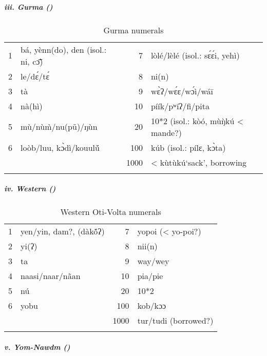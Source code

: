\clearpage
\subparagraph{iii. Gurma ()}

\begin{table}
\caption{\label{tab:3:168}Gurma numerals}


\begin{tabularx}{\textwidth}{lXrX}
\lsptoprule

{1} & bá, yènn(do), den (isol.: ni, c{\={\~{ɔ}}}) & {7} & lòlé/lèlé (isol.: s{\'{ɛ}}{\'{ɛ}}i, yehì)\\
{2} & le/d{\'{ɛ}}/t{\'{ɛ}} & {8} & ni(n)\\
{3} & tà & {9} & w{\`{ɛ}}ʔ/w{\'{ɛ}}ɛ/w{\'{ɔ}}ì/wá{\={i}}\\
{4} & nà(hì) & {10} & píík/pʷíʔ/fi/pita\\
{5} & m{\`{u}}/n{\`{u}}{\`{m}}/nu(p{\~{u}})/ŋ{\`{u}}n & {20} & 10*2 (isol.: kòó, m{\`{u}}{\`{ŋ}}k{\'{u}} < mande?)\\
{6} & loòb/luu, k{\`{ɔ}}dì/kouul{\'{\~u}} & {100} & k{\'{u}}b (isol.: pílɛ, k{\`{ɔ}}ta)\\
&  & {1000} & < k{\`{u}}t{\`{u}}k{\'{u}}‘sack', borrowing\\
\lspbottomrule
\end{tabularx}
\end{table}

\subparagraph{iv. Western ()}

\begin{table}
\caption{\label{tab:3:169}Western Oti-Volta numerals}


\begin{tabularx}{\textwidth}{lXrX}
\lsptoprule

{1} & yen/yin, dam?, (dàk{\'{\~o}}ʔ) & {7} & yopoi (< yo-poi?)\\
{2} & yi(ʔ) & {8} & nii(n)\\
{3} & ta & {9} & way/wey\\
{4} & naasi/naar/n{\~{a}}an & {10} & pia/pie\\
{5} & n{\'{u}} & {20} & 10*2\\
{6} & yobu & {100} & kob/kɔɔ\\
&  & {1000} & tur/tudi (borrowed?)\\
\lspbottomrule
\end{tabularx}
\end{table}

\subparagraph{v. Yom-Nawdm ()}

